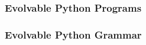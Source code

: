 \documentclass[aspectratio=169]{beamer}
\makeatletter
\newcommand{\red}[1]{{\color{pureminimalistic@text@red} #1}}
\newcommand{\cb}[1]{{\color{c2} #1}}
\newcommand{\cc}[1]{{\color{c3} #1}}
\makeatother
\begin{document}
%   

\begin{frame}[fragile]\frametitle{Evolvable Python Programs}
  
\end{frame}

\begin{frame}[fragile]\frametitle{Evolvable Python Grammar}
  
\end{frame}
\end{document}
